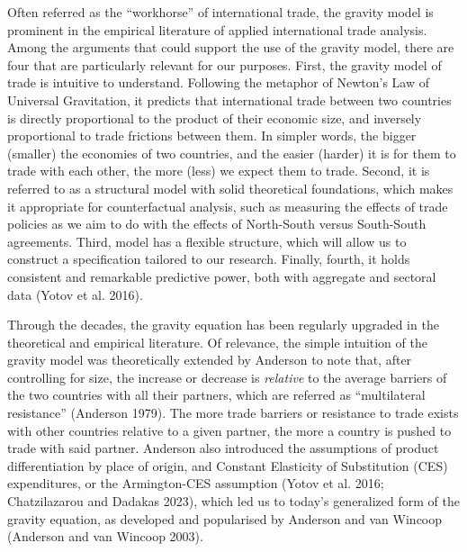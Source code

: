 Often referred as the ``workhorse'' of international trade, the gravity
model is prominent in the empirical literature of applied international
trade analysis. Among the arguments that could support the use of the
gravity model, there are four that are particularly relevant for our
purposes. First, the gravity model of trade is intuitive to understand.
Following the metaphor of Newton's Law of Universal Gravitation, it
predicts that international trade between two countries is directly
proportional to the product of their economic size, and inversely
proportional to trade frictions between them. In simpler words, the
bigger (smaller) the economies of two countries, and the easier (harder)
it is for them to trade with each other, the more (less) we expect them
to trade. Second, it is referred to as a structural model with solid
theoretical foundations, which makes it appropriate for counterfactual
analysis, such as measuring the effects of trade policies as we aim to
do with the effects of North-South versus South-South agreements. Third,
model has a flexible structure, which will allow us to construct a
specification tailored to our research. Finally, fourth, it holds
consistent and remarkable predictive power, both with aggregate and
sectoral data (Yotov et al. 2016).

Through the decades, the gravity equation has been regularly upgraded in
the theoretical and empirical literature. Of relevance, the simple
intuition of the gravity model was theoretically extended by Anderson to
note that, after controlling for size, the increase or decrease is
\emph{relative} to the average barriers of the two countries with all
their partners, which are referred as ``multilateral resistance''
(Anderson 1979). The more trade barriers or resistance to trade exists
with other countries relative to a given partner, the more a country is
pushed to trade with said partner. Anderson also introduced the
assumptions of product differentiation by place of origin, and Constant
Elasticity of Substitution (CES) expenditures, or the Armington-CES
assumption (Yotov et al. 2016; Chatzilazarou and Dadakas 2023), which
led us to today's generalized form of the gravity equation, as developed
and popularised by Anderson and van Wincoop (Anderson and van Wincoop
2003).

